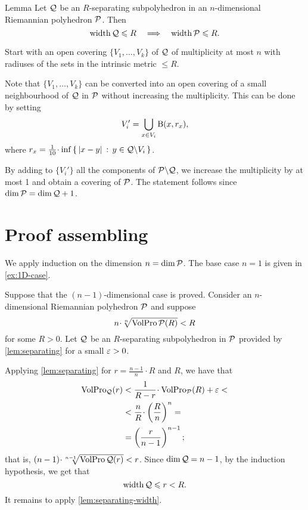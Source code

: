 \begin{thm}{Lemma}\label{lem:separating-width}
Let $\mathcal{Q}$ be an $R$-separating subpolyhedron in an $n$-dimensional Riemannian polyhedron $\mathcal{P}$.
Then 
\[\operatorname{\rm width}\nolimits\mathcal{Q}\leqslant R
\quad\Longrightarrow\quad
\operatorname{\rm width}\nolimits\mathcal{P}\leqslant R.\]
\end{thm}

Start with an open covering $\{V_1,\dots,V_k\}$ of $\mathcal{Q}$ of multiplicity at most $n$ with radiuses of the sets in the intrinsic metric $\le R$.

Note that $\{V_1,\dots,V_k\}$ can be converted into an open covering of
a small neighbourhood of $\mathcal{Q}$ in $\mathcal{P}$ without increasing the multiplicity.
This can be done by setting 
\[V_i'=\bigcup_{x\in V_i}\mathrm{B}{}(x,r_x),\]
where $r_x=\tfrac1{10}\cdot\inf\set{\dist{x}{y}{}}{y\in \spc{Q}\backslash V_i}$.

By adding to  $\{V_i'\}$ all the components of $\mathcal{P}\backslash \mathcal{Q}$,
we increase the multiplicity by at most 1 and obtain a covering of $\mathcal{P}$.
The statement follows since $\dim \spc{P}= \dim \spc{Q}\z+1$.
\qeds

\section*{Proof assembling}

We apply induction on the dimension $n=\operatorname{\rm dim}\nolimits\mathcal{P}$.
The base case $n=1$ is given in \ref{ex:1D-case}.

Suppose that the  $(n-1)$-dimensional case is proved.
Consider an $n$-dimensional Riemannian polyhedron $\mathcal{P}$ and suppose
\[n\cdot \sqrt[n]{\VolPro\spc{P}(R)}< R\]
for some $R>0$.
Let $\mathcal{Q}$ be an $R$-separating subpolyhedron in $\mathcal{P}$ provided by \ref{lem:separating} for a small $\varepsilon>0$.

Applying  \ref{lem:separating} for $r=\tfrac{n-1}n\cdot R$ and $R$, we have that 
\begin{align*}
\VolPro_\spc{Q}(r) &< \frac 1{R-r}\cdot \VolPro_\spc{P}(R)+\eps<
\\
&<\frac {n}{R}\cdot\left(\frac{R}{n}\right)^n=
\\
&=\left(\frac{r}{n-1}\right)^{n-1};
\end{align*}
that is, $(n-1)\cdot \sqrt[n-1]{\VolPro\spc{Q}(r)}< r$.
Since $\operatorname{\rm dim}\nolimits\mathcal{Q}= n-1$, by the induction hypothesis, we get that
\[\operatorname{\rm width}\nolimits\mathcal{Q}\leqslant r<R.\]
It remains to apply \ref{lem:separating-width}.
\qeds





